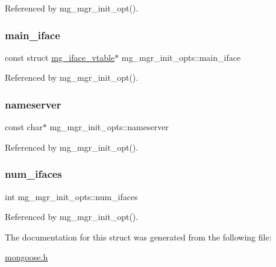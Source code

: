 Referenced by mg\+\_\+mgr\+\_\+init\+\_\+opt().

\mbox{\label{structmg__mgr__init__opts_ac72a1f670b50b1ab79bc9e2790f114c3_ac72a1f670b50b1ab79bc9e2790f114c3}} 
\subsubsection{\texorpdfstring{main\+\_\+iface}{main\_iface}}
{\footnotesize\ttfamily const struct \hyperlink{structmg__iface__vtable}{mg\+\_\+iface\+\_\+vtable}$\ast$ mg\+\_\+mgr\+\_\+init\+\_\+opts\+::main\+\_\+iface}



Referenced by mg\+\_\+mgr\+\_\+init\+\_\+opt().

\mbox{\label{structmg__mgr__init__opts_a1c54576a6dc65d0d1fba5caec53847fd_a1c54576a6dc65d0d1fba5caec53847fd}} 
\subsubsection{\texorpdfstring{nameserver}{nameserver}}
{\footnotesize\ttfamily const char$\ast$ mg\+\_\+mgr\+\_\+init\+\_\+opts\+::nameserver}



Referenced by mg\+\_\+mgr\+\_\+init\+\_\+opt().

\mbox{\label{structmg__mgr__init__opts_a9e6fe35e823019f31446d34e29cc3f4a_a9e6fe35e823019f31446d34e29cc3f4a}} 
\subsubsection{\texorpdfstring{num\+\_\+ifaces}{num\_ifaces}}
{\footnotesize\ttfamily int mg\+\_\+mgr\+\_\+init\+\_\+opts\+::num\+\_\+ifaces}



Referenced by mg\+\_\+mgr\+\_\+init\+\_\+opt().



The documentation for this struct was generated from the following file\+:\begin{DoxyCompactItemize}
\item 
\hyperlink{mongoose_8h}{mongoose.\+h}\end{DoxyCompactItemize}
